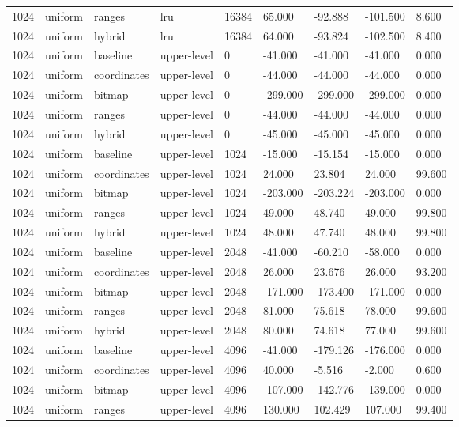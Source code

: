 \begin{tabular}{lllllllll}
1024 & uniform & ranges & lru & 16384 & 65.000 & -92.888 & -101.500 & 8.600 \\
1024 & uniform & hybrid & lru & 16384 & 64.000 & -93.824 & -102.500 & 8.400 \\
1024 & uniform & baseline & upper-level & 0 & -41.000 & -41.000 & -41.000 & 0.000 \\
1024 & uniform & coordinates & upper-level & 0 & -44.000 & -44.000 & -44.000 & 0.000 \\
1024 & uniform & bitmap & upper-level & 0 & -299.000 & -299.000 & -299.000 & 0.000 \\
1024 & uniform & ranges & upper-level & 0 & -44.000 & -44.000 & -44.000 & 0.000 \\
1024 & uniform & hybrid & upper-level & 0 & -45.000 & -45.000 & -45.000 & 0.000 \\
1024 & uniform & baseline & upper-level & 1024 & -15.000 & -15.154 & -15.000 & 0.000 \\
1024 & uniform & coordinates & upper-level & 1024 & 24.000 & 23.804 & 24.000 & 99.600 \\
1024 & uniform & bitmap & upper-level & 1024 & -203.000 & -203.224 & -203.000 & 0.000 \\
1024 & uniform & ranges & upper-level & 1024 & 49.000 & 48.740 & 49.000 & 99.800 \\
1024 & uniform & hybrid & upper-level & 1024 & 48.000 & 47.740 & 48.000 & 99.800 \\
1024 & uniform & baseline & upper-level & 2048 & -41.000 & -60.210 & -58.000 & 0.000 \\
1024 & uniform & coordinates & upper-level & 2048 & 26.000 & 23.676 & 26.000 & 93.200 \\
1024 & uniform & bitmap & upper-level & 2048 & -171.000 & -173.400 & -171.000 & 0.000 \\
1024 & uniform & ranges & upper-level & 2048 & 81.000 & 75.618 & 78.000 & 99.600 \\
1024 & uniform & hybrid & upper-level & 2048 & 80.000 & 74.618 & 77.000 & 99.600 \\
1024 & uniform & baseline & upper-level & 4096 & -41.000 & -179.126 & -176.000 & 0.000 \\
1024 & uniform & coordinates & upper-level & 4096 & 40.000 & -5.516 & -2.000 & 0.600 \\
1024 & uniform & bitmap & upper-level & 4096 & -107.000 & -142.776 & -139.000 & 0.000 \\
1024 & uniform & ranges & upper-level & 4096 & 130.000 & 102.429 & 107.000 & 99.400 \\

\end{tabular}
